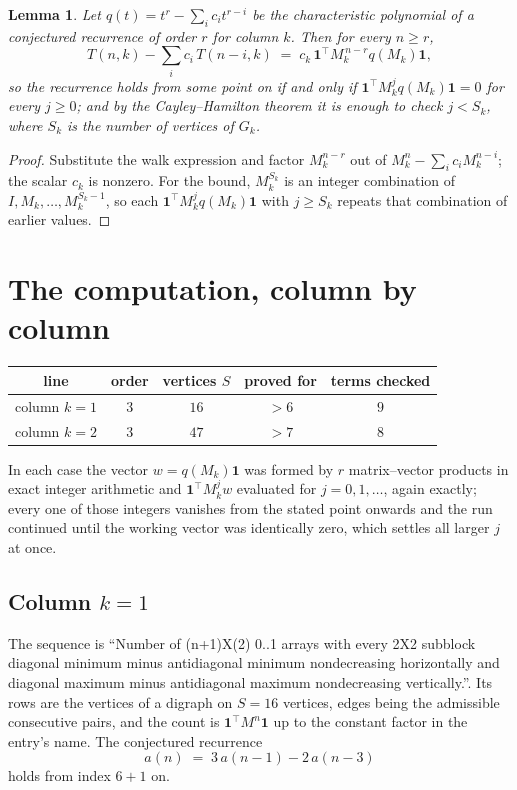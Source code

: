 \documentclass[11pt,a4paper]{article}
\theoremstyle{plain}
\newtheorem{lemma}[theorem]{Lemma}
\theoremstyle{definition}
\begin{document}
\begin{lemma}\label{lem:crit}
Let $q(t)=t^{r}-\sum_i c_it^{r-i}$ be the characteristic polynomial of a conjectured
recurrence of order $r$ for column $k$. Then for every $n\ge r$,
\[
T(n,k)-\sum_i c_i\,T(n-i,k)\;=\;c_k\,\mathbf{1}^{\!\top}M_k^{\,n-r}q(M_k)\mathbf{1},
\]
so the recurrence holds from some point on if and only if
$\mathbf{1}^{\!\top}M_k^{j}q(M_k)\mathbf{1}=0$ for every $j\ge0$; and by the
Cayley--Hamilton theorem it is enough to check $j<S_k$, where $S_k$ is the number of vertices
of $G_k$.
\end{lemma}

\begin{proof}
Substitute the walk expression and factor $M_k^{n-r}$ out of $M_k^{n}-\sum_ic_iM_k^{n-i}$;
the scalar $c_k$ is nonzero. For the bound, $M_k^{S_k}$ is an integer combination of
$I,M_k,\dots,M_k^{S_k-1}$, so each $\mathbf{1}^{\!\top}M_k^{j}q(M_k)\mathbf{1}$ with
$j\ge S_k$ repeats that combination of earlier values.
\end{proof}

\section{The computation, column by column}

\begin{center}
\begin{tabular}{ccccc}
line & order & vertices $S$ & proved for & terms checked \\ \hline
column $k$$=1$ & $3$ & $16$ & $>6$ & $9$ \\
column $k$$=2$ & $3$ & $47$ & $>7$ & $8$ \\
\end{tabular}
\end{center}

In each case the vector $w=q(M_k)\mathbf{1}$ was formed by $r$ matrix--vector products in
exact integer arithmetic and $\mathbf{1}^{\!\top}M_k^{j}w$ evaluated for $j=0,1,\dots$,
again exactly; every one of those integers vanishes from the stated point onwards and the run
continued until the working vector was identically zero, which settles all larger $j$ at once.

\subsection*{Column $k$$=1$}
The sequence is ``Number of (n+1)X(2) 0..1 arrays with every 2X2 subblock diagonal minimum minus antidiagonal minimum nondecreasing horizontally and diagonal maximum minus antidiagonal maximum nondecreasing vertically.''. Its rows are the vertices of a digraph on
$S=16$ vertices, edges being the admissible consecutive pairs, and the count is
$\mathbf{1}^{\!\top}M^{n}\mathbf{1}$ up to the constant factor in the entry's name.
The conjectured recurrence
\[
a(n)\;=\;3\,a(n-1) - 2\,a(n-3)
\]
holds from index $6+1$ on.
\end{document}
